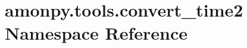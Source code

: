 \hypertarget{namespaceamonpy_1_1tools_1_1convert__time2}{\section{amonpy.\-tools.\-convert\-\_\-time2 Namespace Reference}
\label{namespaceamonpy_1_1tools_1_1convert__time2}
}
